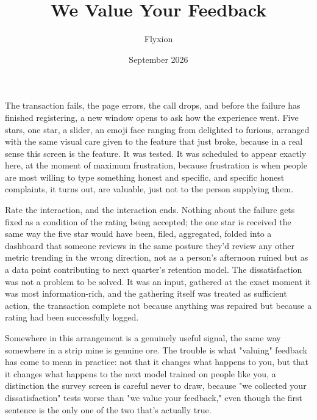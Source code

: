 \documentclass[11pt]{article}
\title{We Value Your Feedback}
\author{Flyxion}
\date{September 2026}
\begin{document}
\maketitle

The transaction fails, the page errors, the call drops, and before the failure has finished registering, a new window opens to ask how the experience went. Five stars, one star, a slider, an emoji face ranging from delighted to furious, arranged with the same visual care given to the feature that just broke, because in a real sense this screen is the feature. It was tested. It was scheduled to appear exactly here, at the moment of maximum frustration, because frustration is when people are most willing to type something honest and specific, and specific honest complaints, it turns out, are valuable, just not to the person supplying them.

Rate the interaction, and the interaction ends. Nothing about the failure gets fixed as a condition of the rating being accepted; the one star is received the same way the five star would have been, filed, aggregated, folded into a dashboard that someone reviews in the same posture they'd review any other metric trending in the wrong direction, not as a person's afternoon ruined but as a data point contributing to next quarter's retention model. The dissatisfaction was not a problem to be solved. It was an input, gathered at the exact moment it was most information-rich, and the gathering itself was treated as sufficient action, the transaction complete not because anything was repaired but because a rating had been successfully logged.

Somewhere in this arrangement is a genuinely useful signal, the same way somewhere in a strip mine is genuine ore. The trouble is what "valuing" feedback has come to mean in practice: not that it changes what happens to you, but that it changes what happens to the next model trained on people like you, a distinction the survey screen is careful never to draw, because "we collected your dissatisfaction" tests worse than "we value your feedback," even though the first sentence is the only one of the two that's actually true.
\end{document}
